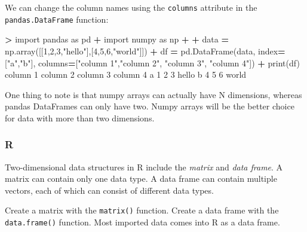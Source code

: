 \documentclass[
]{book}
\newenvironment{Shaded}{\begin{snugshade}}{\end{snugshade}}
\newcommand{\BuiltInTok}[1]{#1}
\newcommand{\DecValTok}[1]{\textcolor[rgb]{0.00,0.00,0.81}{#1}}
\newcommand{\ImportTok}[1]{#1}
\newcommand{\NormalTok}[1]{#1}
\newcommand{\OperatorTok}[1]{\textcolor[rgb]{0.81,0.36,0.00}{\textbf{#1}}}
\newcommand{\StringTok}[1]{\textcolor[rgb]{0.31,0.60,0.02}{#1}}
\begin{document}
We can change the column names using the \texttt{columns} attribute in the \texttt{pandas.DataFrame} function:

\begin{Shaded}
\begin{Highlighting}[]
\OperatorTok{\textgreater{}} \ImportTok{import}\NormalTok{ pandas }\ImportTok{as}\NormalTok{ pd}
\OperatorTok{+} \ImportTok{import}\NormalTok{ numpy }\ImportTok{as}\NormalTok{ np}
\OperatorTok{+} 
\OperatorTok{+}\NormalTok{ data }\OperatorTok{=}\NormalTok{ np.array([[}\DecValTok{1}\NormalTok{,}\DecValTok{2}\NormalTok{,}\DecValTok{3}\NormalTok{,}\StringTok{"hello"}\NormalTok{],[}\DecValTok{4}\NormalTok{,}\DecValTok{5}\NormalTok{,}\DecValTok{6}\NormalTok{,}\StringTok{"world"}\NormalTok{]])}
\OperatorTok{+}\NormalTok{ df }\OperatorTok{=}\NormalTok{ pd.DataFrame(data, index}\OperatorTok{=}\NormalTok{[}\StringTok{"a"}\NormalTok{,}\StringTok{"b"}\NormalTok{], columns}\OperatorTok{=}\NormalTok{[}\StringTok{"column 1"}\NormalTok{,}\StringTok{"column 2"}\NormalTok{, }\StringTok{"column 3"}\NormalTok{, }\StringTok{"column 4"}\NormalTok{])}
\OperatorTok{+} \BuiltInTok{print}\NormalTok{(df)}
\NormalTok{  column }\DecValTok{1}\NormalTok{ column }\DecValTok{2}\NormalTok{ column }\DecValTok{3}\NormalTok{ column }\DecValTok{4}
\NormalTok{a        }\DecValTok{1}        \DecValTok{2}        \DecValTok{3}\NormalTok{    hello}
\NormalTok{b        }\DecValTok{4}        \DecValTok{5}        \DecValTok{6}\NormalTok{    world}
\end{Highlighting}
\end{Shaded}

One thing to note is that numpy arrays can actually have N dimensions, whereas pandas DataFrames can only have two. Numpy arrays will be the better choice for data with more than two dimensions.

\hypertarget{r-9}{%
\subsubsection*{R}\label{r-9}}

Two-dimensional data structures in R include the \emph{matrix} and \emph{data frame}. A matrix can contain only one data type. A data frame can contain multiple vectors, each of which can consist of different data types.

Create a matrix with the \texttt{matrix()} function. Create a data frame with the \texttt{data.frame()} function. Most imported data comes into R as a data frame.
\end{document}
